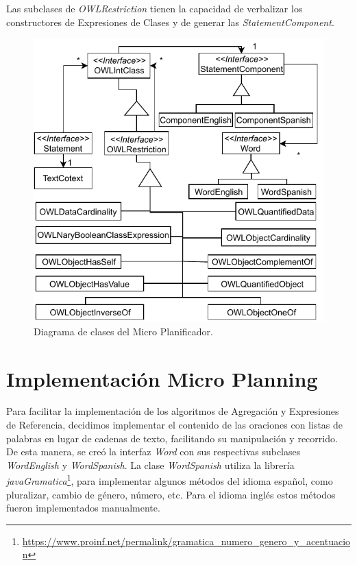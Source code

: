 Las subclases de \emph{OWLRestriction} tienen la capacidad de verbalizar los constructores de Expresiones de Clases y de generar las \emph{StatementComponent}.

\begin{figure}
    \centering
    \includegraphics{img/generacion_documento/diagrama_clases_microplanificador.pdf}
    \caption{Diagrama de clases del Micro Planificador.}
    \label{fig:diagrama_clases_microplanificador}
\end{figure}


\section{Implementación Micro Planning}
Para facilitar la implementación de los algoritmos de Agregación y Expresiones de Referencia, decidimos implementar el contenido de las oraciones con listas de palabras en lugar de cadenas de texto, facilitando su manipulación y recorrido. De esta manera, se creó la interfaz \emph{Word} con sus respectivas subclases \emph{WordEnglish} y \emph{WordSpanish}. 
La clase \emph{WordSpanish} utiliza la librería \emph{javaGramatica}\footnote{\url{https://www.proinf.net/permalink/gramatica_numero_genero_y_acentuacion}}, para implementar algunos métodos del idioma español, como pluralizar, cambio de género, número, etc. Para el idioma inglés estos métodos fueron implementados manualmente.

